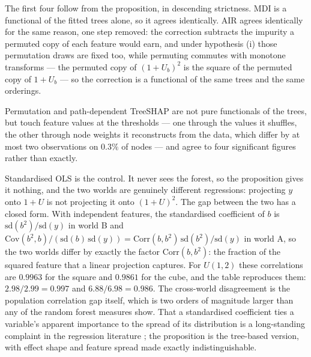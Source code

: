The first four follow from the proposition, in descending strictness. MDI is a
functional of the fitted trees alone, so it agrees identically. AIR agrees
identically for the same reason, one step removed: the correction subtracts the
impurity a permuted copy of each feature would earn, and under hypothesis (i)
those permutation draws are fixed too, while permuting commutes with monotone
transforms --- the permuted copy of $(1+U_b)^2$ is the square of the permuted
copy of $1+U_b$ --- so the correction is a functional of the same trees and the
same orderings. 

Permutation and
path-dependent TreeSHAP \citep{lundberg2020} are not pure functionals of 
the trees, but touch feature values at the
thresholds --- one
through the values it shuffles, the other through node weights it reconstructs
from the data, which differ by at most two observations on $0.3\%$ of nodes ---
and agree to four significant figures rather than exactly.

Standardised OLS is the control. It never sees the forest, so the proposition
gives it nothing, and the two worlds are genuinely different regressions:
projecting $y$ onto $1+U$ is not projecting it onto $(1+U)^2$. The gap between
the two has a closed form. With independent features, the standardised
coefficient of $b$ is $\mathrm{sd}(b^2)/\mathrm{sd}(y)$ in world B and
$\mathrm{Cov}(b^2, b)/(\mathrm{sd}(b)\,\mathrm{sd}(y)) =
\mathrm{Corr}(b, b^2)\,\mathrm{sd}(b^2)/\mathrm{sd}(y)$ in world A, so the two
worlds differ by exactly the factor $\mathrm{Corr}(b, b^2)$: the fraction of the
squared feature that a linear projection captures. For $U(1,2)$ these
correlations are $0.9963$ for the square and $0.9861$ for the cube, and the
table reproduces them: $2.98/2.99 = 0.997$ and $6.88/6.98 = 0.986$. The
cross-world disagreement
is the population correlation gap itself, which is two orders of magnitude
larger than any of the random forest measures show. That a standardised
coefficient ties a variable's apparent importance to the spread of its
distribution is a long-standing complaint in the regression
literature \citep{bring1994}; the proposition is the tree-based version, with
effect shape and feature spread made exactly indistinguishable.


